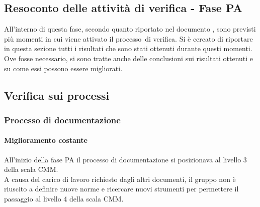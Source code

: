 \documentclass[../PianoDiQualifica.tex]{subfiles}
\begin{document}
\begin{appendices}
\section{Resoconto delle attività di verifica - Fase PA}
All'interno di questa fase\g, secondo quanto riportato nel documento \pianodiprogettov, sono previsti più momenti in cui viene attivato il processo\g\ di verifica. Si è cercato di riportare in questa sezione tutti i risultati che sono stati ottenuti durante questi momenti. Ove fosse necessario, si sono tratte anche delle conclusioni sui risultati ottenuti e su come essi possono essere migliorati.
	
	\subsection{Verifica sui processi}
		\subsubsection{Processo di documentazione}
			\paragraph{Miglioramento costante}
			All'inizio della fase PA il processo di documentazione si posizionava al livello 3 della scala CMM.\\
			A causa del carico di lavoro richiesto dagli altri documenti, il gruppo non è riuscito a definire nuove norme e ricercare nuovi strumenti per permettere il passaggio al livello 4 della scala CMM.
			

\end{appendices}
\end{document}
